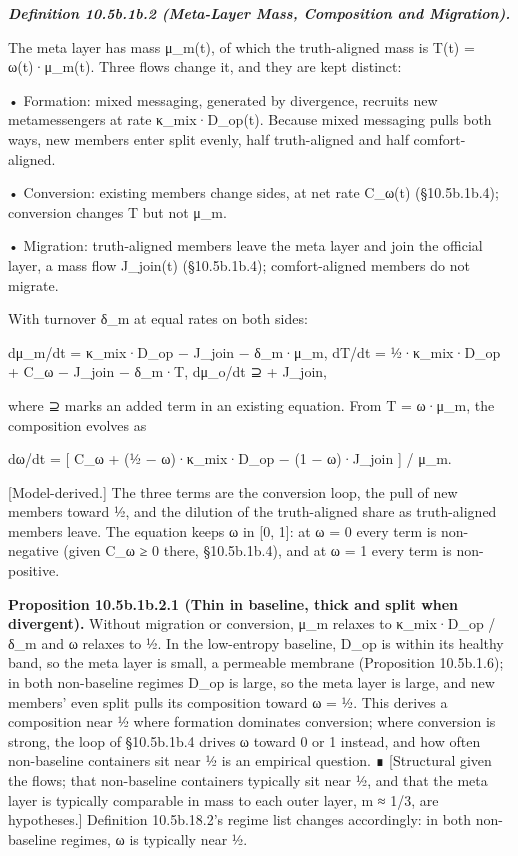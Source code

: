 \documentclass[
]{article}
\begin{document}
\emph{\textbf{Definition 10.5b.1b.2 (Meta-Layer Mass, Composition and
Migration).}}

The meta layer has mass μ\_m(t), of which the truth-aligned mass is T(t)
= ω(t)·μ\_m(t). Three flows change it, and they are kept distinct:

• Formation: mixed messaging, generated by divergence, recruits new
metamessengers at rate κ\_mix·D\_op(t). Because mixed messaging pulls
both ways, new members enter split evenly, half truth-aligned and half
comfort-aligned.

• Conversion: existing members change sides, at net rate C\_ω(t)
(§10.5b.1b.4); conversion changes T but not μ\_m.

• Migration: truth-aligned members leave the meta layer and join the
official layer, a mass flow J\_join(t) (§10.5b.1b.4); comfort-aligned
members do not migrate.

With turnover δ\_m at equal rates on both sides:

dμ\_m/dt = κ\_mix·D\_op − J\_join − δ\_m·μ\_m, dT/dt = ½·κ\_mix·D\_op +
C\_ω − J\_join − δ\_m·T, dμ\_o/dt ⊇ + J\_join,

where ⊇ marks an added term in an existing equation. From T = ω·μ\_m,
the composition evolves as

dω/dt = {[} C\_ω + (½ − ω)·κ\_mix·D\_op − (1 − ω)·J\_join {]} / μ\_m.

{[}Model-derived.{]} The three terms are the conversion loop, the pull
of new members toward ½, and the dilution of the truth-aligned share as
truth-aligned members leave. The equation keeps ω in {[}0, 1{]}: at ω =
0 every term is non-negative (given C\_ω ≥ 0 there, §10.5b.1b.4), and at
ω = 1 every term is non-positive.

\textbf{Proposition 10.5b.1b.2.1 (Thin in baseline, thick and split when
divergent).} Without migration or conversion, μ\_m relaxes to
κ\_mix·D\_op / δ\_m and ω relaxes to ½. In the low-entropy baseline,
D\_op is within its healthy band, so the meta layer is small, a
permeable membrane (Proposition 10.5b.1.6); in both non-baseline regimes
D\_op is large, so the meta layer is large, and new members' even split
pulls its composition toward ω = ½. This derives a composition near ½
where formation dominates conversion; where conversion is strong, the
loop of §10.5b.1b.4 drives ω toward 0 or 1 instead, and how often
non-baseline containers sit near ½ is an empirical question. ∎
{[}Structural given the flows; that non-baseline containers typically
sit near ½, and that the meta layer is typically comparable in mass to
each outer layer, m ≈ 1/3, are hypotheses.{]} Definition 10.5b.18.2's
regime list changes accordingly: in both non-baseline regimes, ω is
typically near ½.
\end{document}
